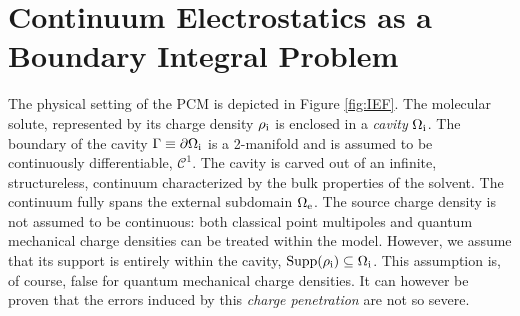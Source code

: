 
\section{Continuum Electrostatics as a Boundary Integral Problem}\label{sec:IEF}

The physical setting of the \gls{PCM} is depicted in Figure \ref{fig:IEF}.
The molecular solute, represented by its charge density
$\rho_\mathrm{i}$ is enclosed in a \emph{cavity} $\Omega_\mathrm{i}$.
The boundary of the cavity $\Gamma\equiv\partial\Omega_\mathrm{i}$ is a
2-manifold and is assumed to be continuously differentiable, \ie $\mathcal{C}^1$.
The cavity is carved out of an infinite, structureless, continuum
characterized by the bulk properties of the solvent.
The continuum fully spans the external subdomain $\Omega_\mathrm{e}$.
The source charge density is not assumed to be continuous: both
classical point multipoles and quantum mechanical charge densities can
be treated within the model.
However, we assume that its support is entirely within the cavity,
$\mathop{}\!\mathrm{Supp}(\rho_\mathrm{i}) \subseteq \Omega_\mathrm{i}$. This assumption is, of course, false
for quantum mechanical charge densities. It can however be proven that
the errors induced by this \emph{charge penetration} are not so
severe.~\autocite{Chipman2000-us, Cances2001-qs, Cances2001-qn}

